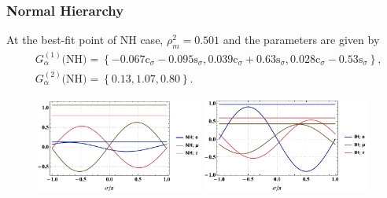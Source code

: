 \documentclass[a4paper,11pt]{scrartcl}
\numberwithin{equation}{section}
\newcommand\co[1]{\mathrm{c}_{#1}}
\newcommand\si[1]{\mathrm{s}_{#1}}
\begin{document}
\subsubsection{Normal Hierarchy}
At the best-fit point of NH case, $\rho_m^2=0.501$ and the parameters are given by
\begin{align}
 &G^{(1)}_\alpha\text{(NH)}=\left\{
 -0.067\co\sigma-0.095\si\sigma,
 0.039\co\sigma+0.63\si\sigma,
 0.028\co\sigma-0.53\si\sigma
\right\},\\
 &G^{(2)}_\alpha\text{(NH)}=\left\{
   0.13, 1.07, 0.80
\right\}.
\end{align}

\begin{figure}[ht]
  \centering
  \includegraphics[width=0.49\textwidth]{bfp_analysis_f_NH.pdf}
  \includegraphics[width=0.49\textwidth]{bfp_analysis_f_IH.pdf}
\end{figure}
\end{document}
